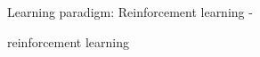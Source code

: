 %
%
%

\begin{frame}[t,allowframebreaks]{
    Learning paradigm: Reinforcement learning - }

    \gls{reinforcement learning}

\end{frame}